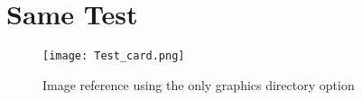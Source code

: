 \chapter{Same Test}
\lipsum[7]

\begin{figure}%
    \centering
    \caption{Image reference using the only graphics directory option}
    \texttt{[image: Test\_card.png]}%
\end{figure}